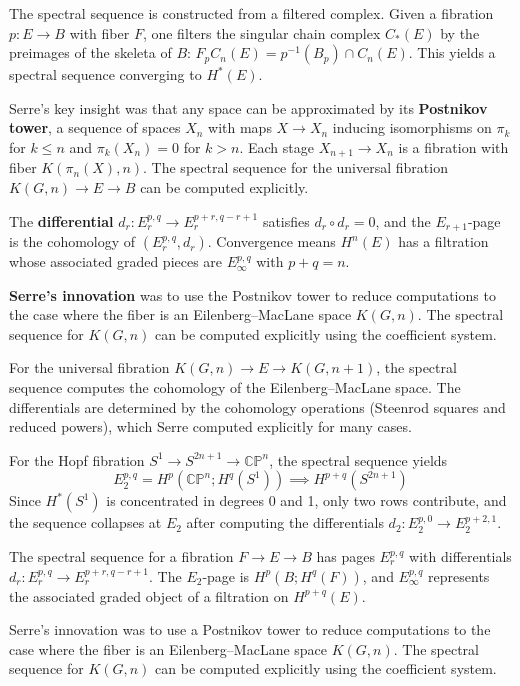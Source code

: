 The spectral sequence is constructed from a filtered complex. Given a fibration $p: E \to B$ with fiber $F$, one filters the singular chain complex $C_*(E)$ by the preimages of the skeleta of $B$: $F_p C_n(E) = p^{-1}(B_p) \cap C_n(E)$. This yields a spectral sequence converging to $H^*(E)$.

Serre's key insight was that any space can be approximated by its \textbf{Postnikov tower}, a sequence of spaces $X_n$ with maps $X \to X_n$ inducing isomorphisms on $\pi_k$ for $k \leq n$ and $\pi_k(X_n) = 0$ for $k > n$. Each stage $X_{n+1} \to X_n$ is a fibration with fiber $K(\pi_n(X), n)$. The spectral sequence for the universal fibration $K(G, n) \to E \to B$ can be computed explicitly.

The \textbf{differential} $d_r: E_r^{p,q} \to E_r^{p+r, q-r+1}$ satisfies $d_r \circ d_r = 0$, and the $E_{r+1}$-page is the cohomology of $(E_r^{p,q}, d_r)$. Convergence means $H^n(E)$ has a filtration whose associated graded pieces are $E_\infty^{p,q}$ with $p+q = n$.

\textbf{Serre's innovation} was to use the Postnikov tower to reduce computations to the case where the fiber is an Eilenberg--MacLane space $K(G, n)$. The spectral sequence for $K(G, n)$ can be computed explicitly using the coefficient system.

For the universal fibration $K(G, n) \to E \to K(G, n+1)$, the spectral sequence computes the cohomology of the Eilenberg--MacLane space. The differentials are determined by the cohomology operations (Steenrod squares and reduced powers), which Serre computed explicitly for many cases.

For the Hopf fibration $S^1 \to S^{2n+1} \to \mathbb{CP}^n$, the spectral sequence yields
\[E_2^{p,q} = H^p(\mathbb{CP}^n; H^q(S^1)) \implies H^{p+q}(S^{2n+1})\]
Since $H^*(S^1)$ is concentrated in degrees 0 and 1, only two rows contribute, and the sequence collapses at $E_2$ after computing the differentials $d_2: E_2^{p,0} \to E_2^{p+2,1}$.

The spectral sequence for a fibration $F \to E \to B$ has pages $E_r^{p,q}$ with differentials $d_r: E_r^{p,q} \to E_r^{p+r, q-r+1}$. The $E_2$-page is $H^p(B; H^q(F))$, and $E_\infty^{p,q}$ represents the associated graded object of a filtration on $H^{p+q}(E)$.

Serre's innovation was to use a Postnikov tower to reduce computations to the case where the fiber is an Eilenberg--MacLane space $K(G, n)$. The spectral sequence for $K(G, n)$ can be computed explicitly using the coefficient system.

